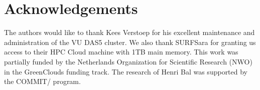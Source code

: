 \section{Acknowledgements}

The authors would like to thank Kees Verstoep for his excellent maintenance
and administration of the VU DAS5 cluster. We also thank SURFSara for
granting us access to their HPC Cloud machine with 1TB main memory.
This work was partially funded by the Netherlands Organization for Scientific
Research (NWO) in the GreenClouds funding track. The research of Henri Bal
was supported by the COMMIT/ program.
